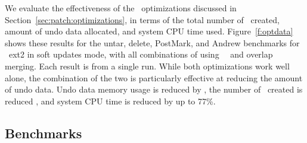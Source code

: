 \opttable{}

We evaluate the effectiveness of the \patch\ optimizations discussed in
Section~\ref{sec:patch:optimizations}, in terms of
%
the total number of \patches\ created, amount of undo data allocated,
and system CPU time used.
%
Figure~\ref{f:optdata} shows these results for the untar, delete,
PostMark, and Andrew benchmarks for \Kudos\ ext2 in soft updates mode,
with all combinations of using \nrb\ \patches\ and overlap merging.
Each result is from a single run.
%
While both optimizations work well alone, the combination of the two
is particularly effective at reducing the amount of undo data.
%
Undo data memory usage is reduced by \patchoptundo,
%
the number of \patches\ created is reduced \patchoptcount,
%
and system CPU time is reduced by up to 77\%.

\begin{comment}
\begin{figure}[t]
\vspace{-0.5\baselineskip}
\centering{
\texttt{[image: rb\_patch\_size]}
}
\vspace{-0.5\baselineskip}
\caption{\label{fig:patchsize-histo} \Rb\ \patch\ size histogram for a sample
workload (extracting a large archive into ext2). All the \patches\ larger than
63 bytes have been optimized into \nrb\ \patches. \Rb\ \patches\ 4 bytes and
smaller account for about 51\% of all \rb\ \patches.}
\end{figure}
\end{comment}

\subsection {Benchmarks}
\label{sec:eval:bench}

\newcommand{\safe}[1]{\textbf{#1}}
\newcommand{\unsafe}[1]{#1}

